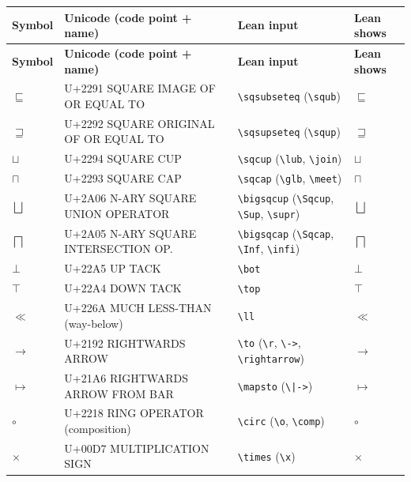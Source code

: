 \documentclass[10pt]{article}
\newcommand{\li}[1]{\texttt{\textbackslash #1}}      %
\newcommand{\uni}[1]{$#1$}                            %
\begin{document}
{\begin{longtable}{@{}p{1.1cm}p{6.9cm}p{5.6cm}p{1.4cm}@{}}
\toprule
\textbf{Symbol} & \textbf{Unicode (code point + name)} & \textbf{Lean input} & \textbf{Lean shows} \\
\midrule
\endfirsthead
\toprule
\textbf{Symbol} & \textbf{Unicode (code point + name)} & \textbf{Lean input} & \textbf{Lean shows} \\
\midrule
\endhead
\uni{\sqsubseteq} & U+2291 SQUARE IMAGE OF OR EQUAL TO      & \li{sqsubseteq} \; (\li{squb})              & \uni{\sqsubseteq} \\
\uni{\sqsupseteq} & U+2292 SQUARE ORIGINAL OF OR EQUAL TO   & \li{sqsupseteq} \; (\li{squp})              & \uni{\sqsupseteq} \\
\uni{\sqcup}      & U+2294 SQUARE CUP                       & \li{sqcup} \; (\li{lub}, \li{join})         & \uni{\sqcup} \\
\uni{\sqcap}      & U+2293 SQUARE CAP                       & \li{sqcap} \; (\li{glb}, \li{meet})         & \uni{\sqcap} \\
\uni{\bigsqcup}   & U+2A06 N-ARY SQUARE UNION OPERATOR      & \li{bigsqcup} \; (\li{Sqcup}, \li{Sup}, \li{supr}) & \uni{\bigsqcup} \\
\uni{\bigsqcap}   & U+2A05 N-ARY SQUARE INTERSECTION OP.    & \li{bigsqcap} \; (\li{Sqcap}, \li{Inf}, \li{infi}) & \uni{\bigsqcap} \\
\uni{\bot}        & U+22A5 UP TACK                          & \li{bot}                                    & \uni{\bot} \\
\uni{\top}        & U+22A4 DOWN TACK                        & \li{top}                                    & \uni{\top} \\
\uni{\ll}         & U+226A MUCH LESS-THAN (way-below)       & \li{ll}                                     & \uni{\ll} \\
\uni{\to}         & U+2192 RIGHTWARDS ARROW                 & \li{to} \; (\li{r}, \texttt{\textbackslash->}, \li{rightarrow}) & \uni{\to} \\
\uni{\mapsto}     & U+21A6 RIGHTWARDS ARROW FROM BAR        & \li{mapsto} \; (\texttt{\textbackslash|->}) & \uni{\mapsto} \\
\uni{\circ}       & U+2218 RING OPERATOR (composition)      & \li{circ} \; (\li{o}, \li{comp})            & \uni{\circ} \\
\uni{\times}      & U+00D7 MULTIPLICATION SIGN              & \li{times} \; (\li{x})                      & \uni{\times} \\

\end{longtable}}
\end{document}
